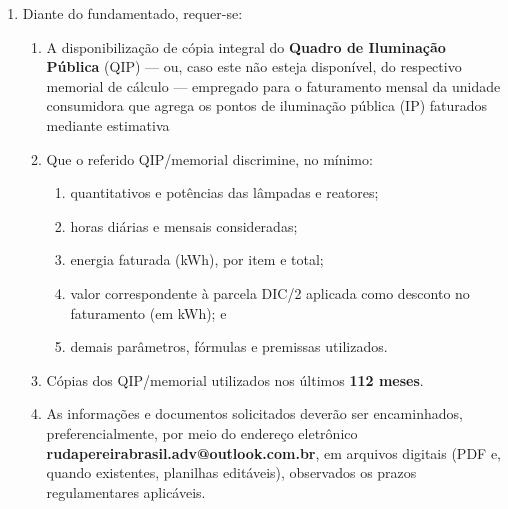 \begin{enumerate}[resume]
  \item Diante do fundamentado, requer-se:
  \begin{enumerate}
    \item A disponibilização de cópia integral do \textbf{Quadro de Iluminação Pública} (QIP) — ou, caso este não esteja disponível, do respectivo memorial de cálculo — empregado para o faturamento mensal da unidade consumidora que agrega os pontos de iluminação pública (IP) faturados mediante estimativa
    \item Que o referido QIP/memorial discrimine, no mínimo:
    \begin{enumerate}
      \item quantitativos e potências das lâmpadas e reatores;
      \item horas diárias e mensais consideradas;
      \item energia faturada (kWh), por item e total;
      \item valor correspondente à parcela DIC/2 aplicada como desconto no faturamento (em kWh); e
      \item demais parâmetros, fórmulas e premissas utilizados.
    \end{enumerate}
    \item Cópias dos QIP/memorial utilizados nos últimos \textbf{112 meses}.
    \item As informações e documentos solicitados deverão ser encaminhados, preferencialmente, por meio do endereço eletrônico \textbf{rudapereirabrasil.adv@outlook.com.br}, em arquivos digitais (PDF e, quando existentes, planilhas editáveis), observados os prazos regulamentares aplicáveis.
  \end{enumerate}

\end{enumerate}





